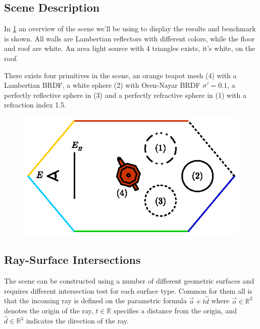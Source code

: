 \documentclass[a4paper, twocolumn]{article}
\begin{document}
        \subsection{Scene Description} \label{sec:scene_description}

        In \cref{fig:scene_description} an overview of the scene we'll be using to display the results and benchmark is shown. All walls are Lambertian reflectors with different colors, while the floor and roof are white. An area light source with 4 triangles exists, it's white, on the roof.

        There exists four primitives in the scene, an orange teapot mesh (4) with a Lambertian BRDF, a white sphere (2) with Oren-Nayar BRDF \(\sigma' = 0.1\), a perfectly reflective sphere in (3) and a perfectly refractive sphere in (1) with a refraction index 1.5.

        \begin{figure}[ht]
            \centering
            \includegraphics[width=0.8\linewidth]{share/scene_description.eps}
            \caption{}
            \label{fig:scene_description}
        \end{figure}

        \clearpage

        \subsection{Ray-Surface Intersections} \label{sec:ray-surface_intersections}

        The scene can be constructed using a number of different geometric surfaces and requires different intersection test for each surface type. Common for them all is that the incoming ray is defined on the parametric formula \( \vec{o} + t \hat{d} \) where \( \vec{o} \in \mathbb{R}^3\) denotes the origin of the ray, \(t \in \mathbb{R}\) specifies a distance from the origin, and \(\hat{d} \in \mathbb{R}^3\) indicates the direction of the ray.
            
\end{document}

